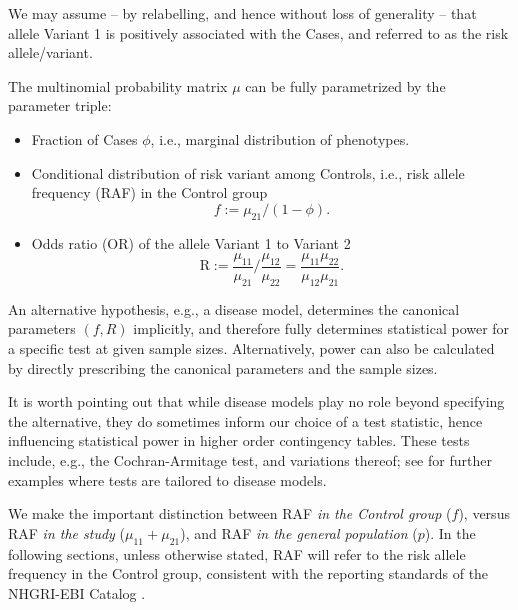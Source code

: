 We may assume -- by relabelling, and hence without loss of generality -- that allele Variant 1 is positively associated with the Cases, and referred to as the risk allele/variant. 

The multinomial probability matrix $\mu$ can be fully parametrized by the parameter triple:

\begin{itemize}
    \item Fraction of Cases $\phi$, i.e., marginal distribution of phenotypes.
    \item Conditional distribution of risk variant among Controls, i.e., risk allele frequency (RAF) in the Control group 
    \begin{equation} \label{eq:risk-allele-frequency}
    f := \mu_{21}/(1-\phi).
    \end{equation}
    \item Odds ratio (OR) of the allele Variant 1 to Variant 2
    \begin{equation} \label{eq:odds-ratio}
    \text{R} := \frac{\mu_{11}}{\mu_{21}}\Big/\frac{\mu_{12}}{\mu_{22}}
    = \frac{\mu_{11}\mu_{22}}{\mu_{12}\mu_{21}}.
    \end{equation}
\end{itemize}

An alternative hypothesis, e.g., a disease model, determines the canonical parameters $(f, R)$ implicitly,
and therefore fully determines statistical power for a specific test at given sample sizes.
Alternatively, power can also be calculated by directly prescribing the canonical parameters and the sample sizes.

It is worth pointing out that while disease models play no role beyond specifying the alternative, they do sometimes inform our choice of a test statistic, hence influencing statistical power in higher order contingency tables.
These tests include, e.g., the Cochran-Armitage test, and variations thereof;
see \cite{Gonzalez08, Li08} for further examples where tests are tailored to disease models. 

We make the important distinction between RAF \emph{in the Control group} ($f$), versus RAF \emph{in the study} ($\mu_{11}+\mu_{21}$), and RAF \emph{in the general population} ($p$).
In the following sections, unless otherwise stated, RAF will refer to the risk allele frequency in the Control group, consistent with the reporting standards of the NHGRI-EBI Catalog \citep{MacArthur16}.

